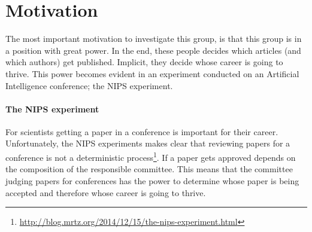\documentclass{ou-report}
\newcommand{\outline}[1]{{\color{blue} #1}}
\begin{document}
\section{Motivation}
The most important motivation to investigate this group, is that this group is 
in a position with great power. In the end, these people decides which articles
(and which authors) get published. Implicit, they decide whose career is going 
to thrive.
This power becomes evident in an experiment conducted on an Artificial
Intelligence conference; the NIPS experiment.



\paragraph{The NIPS experiment}
For scientists getting a paper in a conference is important for their career. 
Unfortunately, the NIPS experiments makes clear that reviewing papers for a 
conference is not a deterministic
process\footnote{\url{http://blog.mrtz.org/2014/12/15/the-nips-experiment.html}}.
If a paper gets approved depends on the composition of the 
responsible committee. This means that the committee judging papers for 
conferences has the power to determine whose paper is being accepted and 
therefore whose career is going to thrive.
\end{document}
